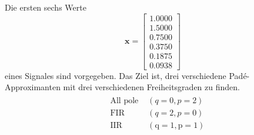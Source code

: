 \begin{beispiel}

Die ersten sechs Werte 
\begin{equation*}
\bm x=\left[
\begin{array}{l}
1.0000\\
1.5000\\
0.7500\\
0.3750\\
0.1875 \\
0.0938
\end{array}\right]
\end{equation*}
eines Signales sind vorgegeben.
Das Ziel ist, drei verschiedene Padé-Approximanten mit drei verschiedenen Freiheitsgraden zu finden.
\begin{equation*}\begin{aligned}
&\begin{array}{ll}
\text { All pole } & (q=0, p=2) \\
\text { FIR } & (q=2, p=0)\\
\text { IIR } &(\mathrm{q}=1, \mathrm{p}=1)
\end{array}\\
\end{aligned}\end{equation*}
\begin{enumerate}



\end{enumerate}
\end{beispiel}
